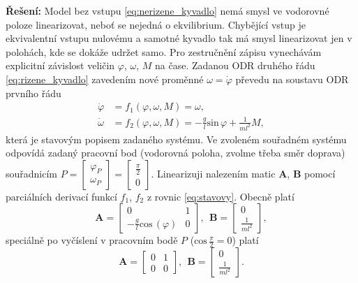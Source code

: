 \documentclass[twoside]{article}
\begin{document}
\textbf{Řešení:}
Model bez vstupu \eqref{eq:nerizene_kyvadlo} nemá smysl ve vodorovné poloze linearizovat, neboť se nejedná o ekvilibrium. Chybějící vstup je ekvivalentní vstupu nulovému a samotné kyvadlo
tak má smysl linearizovat jen v polohách, kde se dokáže udržet samo. Pro zestručnění zápisu vynechávám explicitní závislost veličin $\varphi$, $\omega$, $M$ na čase.
Zadanou ODR druhého řádu \eqref{eq:rizene_kyvadlo} zavedením nové proměnné $\omega = \dot{\varphi}$ převedu na soustavu ODR prvního řádu
\begin{equation}
	\begin{split}
		\dot{\varphi} &= f_1(\varphi, \omega, M) = \omega, \\
		\dot{\omega} &= f_2(\varphi, \omega, M) = - \frac{g}{l} \text{sin}\, \varphi + \frac{1}{ml^2} M,
	\end{split}
	\label{eq:stavovy}
\end{equation}
která je stavovým popisem zadaného systému. Ve zvoleném souřadném systému odpovídá zadaný pracovní bod (vodorovná poloha, zvolme třeba směr doprava)
souřadnicím $P = \begin{bmatrix}
	\varphi_P \\ \omega_P
\end{bmatrix} = \begin{bmatrix}
	\frac{\pi}{2} \\ 0
\end{bmatrix}$. Linearizuji nalezením matic $\mathbf{A}$, $\mathbf{B}$ pomocí parciálních derivací funkcí $f_1$, $f_2$ z rovnic \eqref{eq:stavovy}.
Obecně platí
\begin{equation}
	\mathbf{A} = \begin{bmatrix}
		0 & 1 \\
		- \frac{g}{l} \text{cos}\, (\varphi) & 0
	\end{bmatrix},~~\mathbf{B} = \begin{bmatrix}
		0 \\ \frac{1}{ml^2}
	\end{bmatrix},
\end{equation}
speciálně po vyčíslení v pracovním bodě $P$ ($\text{cos}\,\frac{\pi}{2} = 0$) platí
\begin{equation}
	\mathbf{A} = \begin{bmatrix}
		0 & 1 \\
		0 & 0
	\end{bmatrix},~~\mathbf{B} = \begin{bmatrix}
		0 \\ \frac{1}{ml^2}
	\end{bmatrix}.
\end{equation}
\end{document}
